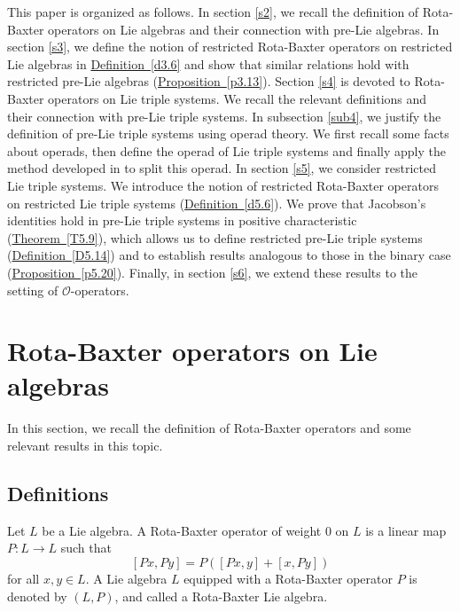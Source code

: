 \documentclass[11pt, twoside]{article}
\begin{document}
This paper is organized as follows. In section \eqref{s2}, we recall the definition of Rota-Baxter operators on Lie algebras and their connection with pre-Lie algebras. In section \eqref{s3}, we define the notion of restricted Rota-Baxter operators on restricted Lie algebras in \hyperref[d3.6]{Definition~\ref*{d3.6}} and show that similar relations hold with restricted pre-Lie algebras (\hyperref[p3.13]{Proposition~\ref*{p3.13}}). Section \eqref{s4} is devoted to Rota-Baxter operators on Lie triple systems. We recall the relevant definitions and their connection with pre-Lie triple systems. In subsection \eqref{sub4}, we justify the definition of pre-Lie triple systems using operad theory. We first recall some facts about operads, then define the operad of Lie triple systems and finally apply the method developed in \cite{PBG13} to split this operad. In section \eqref{s5}, we consider restricted Lie triple systems. We introduce the notion of restricted Rota-Baxter operators on restricted Lie triple systems (\hyperref[d5.6]{Definition~\ref*{d5.6}}). We prove that Jacobson's identities hold in pre-Lie triple systems in positive characteristic (\hyperref[T5.9]{Theorem~\ref*{T5.9}}), which allows us to define restricted pre-Lie triple systems (\hyperref[D5.14]{Definition~\ref*{D5.14}}) and to establish results analogous to those in the binary case (\hyperref[p5.20]{Proposition~\ref*{p5.20}}). Finally, in section \eqref{s6}, we extend these results to the setting of $\mathcal{O} $-operators.
\section{Rota-Baxter operators on Lie algebras}\label{s2}

In this section, we recall the definition of Rota-Baxter operators and some relevant results in this topic.

\subsection{Definitions}

\begin{defi}
    Let $L$ be a Lie algebra. A Rota-Baxter operator of weight $0$ on $L$ is a linear map $P:L\to L$ such that $$[Px,Py]=P([Px,y] +[x,Py]) $$ for all $x,y\in L$. A Lie algebra $L$ equipped with a Rota-Baxter operator $P$ is denoted by $(L,P)$, and called a Rota-Baxter Lie algebra.
\end{defi}
\end{document}
